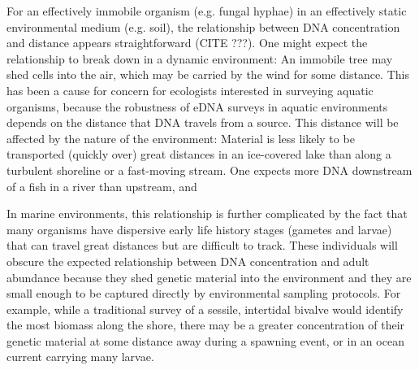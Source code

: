 \documentclass[11pt,letterpaper]{article} %
\begin{document}
For an effectively immobile organism (e.g. fungal hyphae) 
in an effectively static environmental medium (e.g. soil), 
the relationship between DNA concentration and distance appears straightforward (CITE ???).
One might expect the relationship to break down in a dynamic environment: 
An immobile tree may shed cells into the air, which may be carried by the wind for some distance.
This has been a cause for concern for ecologists interested in surveying aquatic organisms, 
because the robustness of eDNA surveys in aquatic environments depends on the distance that DNA travels from a source. 
This distance will be affected by the nature of the environment: 
Material is less likely to be transported (quickly over) great distances in an ice-covered lake 
than along a turbulent shoreline or a fast-moving stream.
One expects more DNA downstream of a fish in a river than upstream, and 


In marine environments, this relationship is further complicated by the fact 
that many organisms have dispersive early life history stages (gametes and larvae) 
that can travel great distances but are difficult to track.
These individuals will obscure the expected relationship between DNA concentration and adult abundance because they 
shed genetic material into the environment and 
they are small enough to be captured directly by environmental sampling protocols.
For example, while a traditional survey of a sessile, intertidal bivalve would 
identify the most biomass along the shore, there may be a greater concentration 
of their genetic material at some distance away during a spawning event, or in 
an ocean current carrying many larvae.

\end{document}
